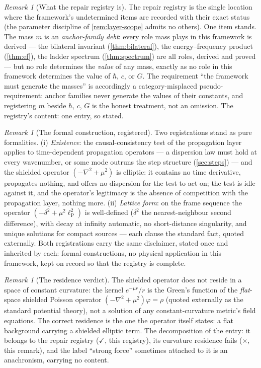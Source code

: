 \documentclass[11pt]{amsbook}
\theoremstyle{plain}
\theoremstyle{definition}
\theoremstyle{remark}
\newtheorem{remark}[theorem]{Remark}
\begin{document}
\begin{remark}[What the repair registry is]\label{rem:repair-status}
The repair registry is the single location where the framework's undetermined items are recorded with their exact status (the parameter discipline of \cref{rem:layer-scope} admits no others). One item stands. The mass $m$ is an \emph{anchor-family debt}: every role mass plays in this framework is derived --- the bilateral invariant (\cref{thm:bilateral}), the energy--frequency product (\cref{thm:ef}), the ladder spectrum (\cref{thm:spectrum}) are all roles, derived and proved --- but no role determines the \emph{value} of any mass, exactly as no role in this framework determines the value of $\hbar$, $c$, or $G$. The requirement ``the framework must generate the masses'' is accordingly a category-misplaced pseudo-requirement: anchor families never generate the values of their constants, and registering $m$ beside $\hbar$, $c$, $G$ is the honest treatment, not an omission. The registry's content: one entry, so stated.
\end{remark}

\begin{remark}[The formal construction, registered]\label{rem:formal-construction}
Two registrations stand as pure formalities. (i) \emph{Existence}: the causal-consistency test of the propagation layer applies to time-dependent propagation operators --- a dispersion law must hold at every wavenumber, or some mode outruns the step structure (\cref{sec:steps}) --- and the shielded operator $(-\nabla^{2} + \mu^{2})$ is elliptic: it contains no time derivative, propagates nothing, and offers no dispersion for the test to act on; the test is idle against it, and the operator's legitimacy is the absence of competition with the propagation layer, nothing more. (ii) \emph{Lattice form}: on the frame sequence the operator $(-\delta^{2} + \mu^{2}\ell_{\mathrm P}^{2})$ is well-defined ($\delta^{2}$ the nearest-neighbour second difference), with decay at infinity automatic, no short-distance singularity, and unique solutions for compact sources --- each clause the standard fact, quoted externally. Both registrations carry the same disclaimer, stated once and inherited by each: formal constructions, no physical application in this framework, kept on record so that the registry is complete.
\end{remark}

\begin{remark}[The residence verdict]\label{rem:residence-verdict}
The shielded operator does not reside in a space of constant curvature: the kernel $e^{-\mu r}/r$ is the Green's function of the \emph{flat}-space shielded Poisson operator $(-\nabla^{2}+\mu^{2})\varphi = \rho$ (quoted externally as the standard potential theory), not a solution of any constant-curvature metric's field equations. The correct residence is the one the operator itself states: a flat background carrying a shielded elliptic term. The decomposition of the entry: it belongs to the repair registry ($\checkmark$, this registry), its curvature residence fails ($\times$, this remark), and the label ``strong force'' sometimes attached to it is an anachronism, carrying no content.
\end{remark}
\end{document}
